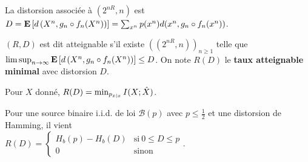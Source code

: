	La distorsion associée à $(2^{nR},n)$ est $D = \mathbf{E} \left[ d \left( X^n, g_n \circ f_n (X^n) \right) \right] = \sum_{x^n} p(x^n) d(x^n, g_n \circ f_n (x^n) )$.
	
	\begin{defn}
		$(R,D)$ est dit atteignable s'il existe $((2^{nR},n))_{n \geq 1}$ telle que $\limsup_{n \to \infty} \mathbf{E} \left[ d \left( X^n, g_n \circ f_n (X^n) \right) \right] \leq D$.
		On note $R(D)$ le \textbf{taux atteignable minimal} avec distorsion $D$.
	\end{defn}

	\begin{thm}
		Pour $X$ donné, $R(D) = \min_{p_{\hat{x} \mid x}} I(X;\Hat{X})$.
	\end{thm}
	
	\begin{thm}
		Pour une source binaire i.i.d. de loi $\mathcal{B}(p)$ avec $p \leq \frac{1}{2}$ et une distorsion de Hamming, il vient\\
		$R(D) = \left\{ \begin{array}{ll}
			H_b(p) - H_b(D) & \text{si}\ 0 \leq D \leq p \\
			0 & \text{sinon}
			\end{array} \right. $.
	\end{thm}
